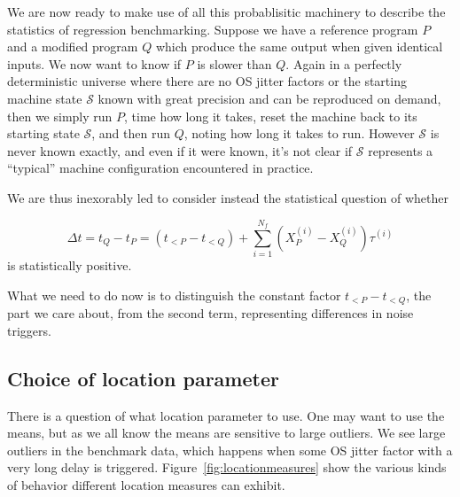 \documentclass[conference]{IEEEtran}
\begin{document}
We are now ready to make use of all this probablisitic machinery to describe the statistics
of regression benchmarking. Suppose we have a reference program $P$ and a modified program
$Q$ which produce the same output when given identical inputs. We now want to know if $P$ is
slower than $Q$. Again in a perfectly deterministic universe where there are no OS jitter
factors or the starting machine state $\mathcal S$ known with great precision and can be
reproduced on demand, then we simply run $P$, time how long it takes, reset the machine back
to its starting state $\mathcal S$, and then run $Q$, noting how long it takes to run.
However $\mathcal S$ is never known exactly, and even if it were known, it's not clear if
$\mathcal S$ represents a ``typical'' machine configuration encountered in practice.

We are thus inexorably led to consider instead the statistical question of whether

\begin{equation}
\Delta t = t_Q - t_P
= (t_{<P} - t_{<Q}) + \sum_{i=1}^{N_f} (X^{(i)}_P - X^{(i)}_Q) \tau^{(i)}
\end{equation}
%
is statistically positive.

What we need to do now is to distinguish the constant factor $t_{<P} - t_{<Q}$, the part we
care about, from the second term, representing differences in noise triggers.


\subsection{Choice of location parameter}

There is a question of what location parameter to use. One may want to use the means, but as
we all know the means are sensitive to large outliers. We see large outliers in the
benchmark data, which happens when some OS jitter factor with a very long delay is
triggered. Figure~\ref{fig:locationmeasures} show the various kinds of behavior different
location measures can exhibit.
\end{document}
